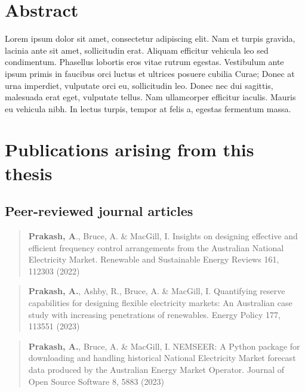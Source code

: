 \documentclass[12pt,a4paper,]{report}
\begin{document}

\hypertarget{abstract}{%
\chapter*{Abstract}\label{abstract}}

Lorem ipsum dolor sit amet, consectetur adipiscing elit. Nam et turpis
gravida, lacinia ante sit amet, sollicitudin erat. Aliquam efficitur
vehicula leo sed condimentum. Phasellus lobortis eros vitae rutrum
egestas. Vestibulum ante ipsum primis in faucibus orci luctus et
ultrices posuere cubilia Curae; Donec at urna imperdiet, vulputate orci
eu, sollicitudin leo. Donec nec dui sagittis, malesuada erat eget,
vulputate tellus. Nam ullamcorper efficitur iaculis. Mauris eu vehicula
nibh. In lectus turpis, tempor at felis a, egestas fermentum massa.
\newpage

\hypertarget{publications-arising-from-this-thesis}{%
\chapter*{Publications arising from this
thesis}\label{publications-arising-from-this-thesis}}

\hypertarget{peer-reviewed-journal-articles}{%
\section*{Peer-reviewed journal
articles}\label{peer-reviewed-journal-articles}}

\begin{quote}
\textbf{Prakash, A}., Bruce, A. \& MacGill, I. Insights on designing
effective and efficient frequency control arrangements from the
Australian National Electricity Market. Renewable and Sustainable Energy
Reviews 161, 112303 (2022)
\end{quote}

\begin{quote}
\textbf{Prakash, A.}, Ashby, R., Bruce, A. \& MacGill, I. Quantifying
reserve capabilities for designing flexible electricity markets: An
Australian case study with increasing penetrations of renewables. Energy
Policy 177, 113551 (2023)
\end{quote}

\begin{quote}
\textbf{Prakash, A.}, Bruce, A. \& MacGill, I. NEMSEER: A Python package
for downloading and handling historical National Electricity Market
forecast data produced by the Australian Energy Market Operator. Journal
of Open Source Software 8, 5883 (2023)
\end{quote}
\end{document}
